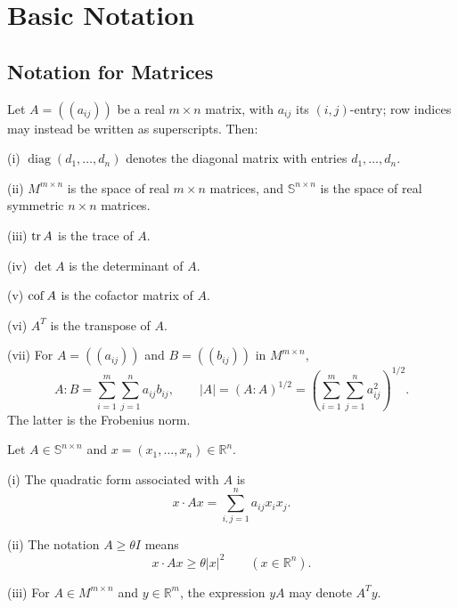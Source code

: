 
\section{Basic Notation}
\label{sec:basic-notation}

\subsection{Notation for Matrices}
\label{sec:notation-for-matrices}

\begin{definition}
\label{def:matrix-notation-basic}
Let $A=((a_{ij}))$ be a real $m\times n$ matrix, with $a_{ij}$ its $(i,j)$-entry; row indices may instead be written as superscripts. Then:

(i) $\operatorname{diag}(d_1,\ldots,d_n)$ denotes the diagonal matrix with entries $d_1,\ldots,d_n$.

(ii) $M^{m\times n}$ is the space of real $m\times n$ matrices, and $\mathbb{S}^{n\times n}$ is the space of real symmetric $n\times n$ matrices.

(iii) $\operatorname{tr} A$ is the trace of $A$.

(iv) $\det A$ is the determinant of $A$.

(v) $\operatorname{cof} A$ is the cofactor matrix of $A$.

(vi) $A^T$ is the transpose of $A$.

(vii) For $A=((a_{ij}))$ and $B=((b_{ij}))$ in $M^{m\times n}$,
\[
A:B=\sum_{i=1}^m\sum_{j=1}^n a_{ij}b_{ij},
\qquad
|A|=(A:A)^{1/2}
=\left(\sum_{i=1}^m\sum_{j=1}^n a_{ij}^2\right)^{1/2}.
\]
The latter is the Frobenius norm.
\end{definition}

\begin{definition}
\label{def:matrix-quadratic-form-notation}
Let $A\in\mathbb{S}^{n\times n}$ and $x=(x_1,\ldots,x_n)\in\mathbb R^n$.

(i) The quadratic form associated with $A$ is
\[
x\cdot Ax=\sum_{i,j=1}^n a_{ij}x_ix_j.
\]

(ii) The notation $A\geq\theta I$ means
\[
x\cdot Ax\geq\theta|x|^2\qquad(x\in\mathbb R^n).
\]

(iii) For $A\in M^{m\times n}$ and $y\in\mathbb R^m$, the expression $yA$ may denote $A^Ty$.
\end{definition}


